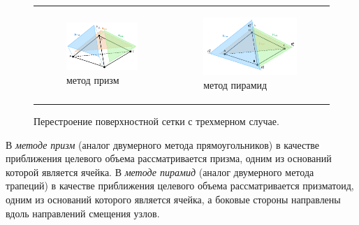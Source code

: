 \documentclass[a4paper,14pt]{extarticle}                     %
\theoremstyle{plain}                                         %
\begin{document}
\begin{figure}[h]
\centering
\begin{tabular}{ll}
\begin{subfigure}{0.4\textwidth}\centering\includegraphics[width=1.0\columnwidth]{fig/3dr_prisms.pdf}\caption{метод призм}\end{subfigure} &
\begin{subfigure}{0.45\textwidth}\centering\includegraphics[width=1.0\columnwidth]{fig/3dr_pyramids.pdf}\caption{метод пирамид}\end{subfigure}
\end{tabular}
\singlespacing
\caption{Перестроение поверхностной сетки с трехмерном случае.}
\label{fig:text_1_remesh3}
\end{figure}

В \textit{методе призм} (аналог двумерного метода прямоугольников) в качестве приближения целевого объема рассматривается призма, одним из оснований которой является ячейка.
В \textit{методе пирамид} (аналог двумерного метода трапеций) в качестве приближения целевого объема рассматривается призматоид, одним из оснований которого является ячейка, а боковые стороны направлены вдоль направлений смещения узлов.
\end{document}
